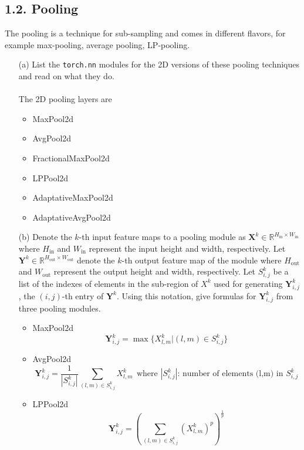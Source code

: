 \documentclass[11pt]{article}
\newcommand{\0}{\mat{0}}
\newcommand{\matr}[1]{\bm{#1}}     %
\begin{document}
\subsection*{1.2. Pooling}
The pooling is a technique for sub-sampling and comes in different flavors, for example max-pooling, average pooling, LP-pooling. 
\begin{itemize}
    \item[(a)] List the \texttt{torch.nn} modules for the 2D versions of these pooling techniques and read on what they do.\\
    \medskip
    \\
    The 2D pooling layers are
	\begin{itemize}
		\item MaxPool2d
		\item AvgPool2d
		\item FractionalMaxPool2d
		\item LPPool2d
		\item AdaptativeMaxPool2d
		\item AdaptativeAvgPool2d
	\end{itemize}
    
    
    \item[(b)] Denote the $k$-th input feature maps to a pooling module as $\matr{X}^k \in \mathbb{R}^{H_{\textrm{in}}\times W_{\textrm{in}}} $ where $H_{\textrm{in}}$ and $W_{\text{in}}$ represent the input height and width, respectively. Let $\matr{Y}^k \in \mathbb{R}^{H_{\text{out}}\times W_{\textrm{out}}}$ denote the $k$-th output feature map of the module where $H_{\textrm{out}}$ and $W_{\textrm{out}}$ represent the output height and width, respectively. Let $S^{k}_{i,j}$ be a list of the indexes of elements in the sub-region of $X^k $ used for generating $\matr{Y}^k_{i,j}$, the $(i,j)$-th entry of $\matr{Y}^{k}$. 
    Using this notation, give formulas for $\matr{Y}^k_{i,j} $ from three pooling modules.\\
    
	\begin{itemize}
		\item MaxPool2d
		\[
			\matr{Y}^k_{i,j} = \max \{ X^k_{l,m}| (l,m) \in  S^{k}_{i,j} \}
		\]
		\item AvgPool2d
		\[
			\matr{Y}^k_{i,j} = \frac{1}{|  S^{k}_{i,j} |} \sum_{(l,m) \in  S^{k}_{i,j}} X^k_{l,m} ~~  \text{where } |  S^{k}_{i,j} | \text{: number of elements (l,m) in } S^{k}_{i,j}
		\]	
		\item LPPool2d
		\[
			\matr{Y}^k_{i,j} =  (\sum_{(l,m) \in  S^{k}_{i,j}} (X^k_{l,m})^p)^{\frac{1}{p}}
		\]				
	\end{itemize}
        

\end{itemize}
\end{document}
